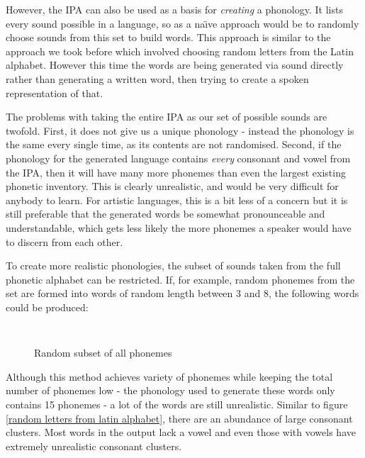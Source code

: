 \documentclass{report}
\begin{document}
	However, the IPA can also be used as a basis for \textit{creating} a phonology. It lists every sound possible in a language, so as a na\"{\i}ve approach would be to randomly choose sounds from this set to build words. This approach is similar to the approach we took before which involved choosing random letters from the Latin alphabet. However this time the words are being generated via sound directly rather than generating a written word, then trying to create a spoken representation of that.
	
	The problems with taking the entire IPA as our set of possible sounds are twofold. First, it does not give us a unique phonology - instead the phonology is the same every single time, as its contents are not randomised. Second, if the phonology for the generated language contains \textit{every} consonant and vowel from the IPA, then it will have many more phonemes than even the largest existing phonetic inventory. This is clearly unrealistic, and would be very difficult for anybody to learn. For artistic languages, this is a bit less of a concern but it is still preferable that the generated words be somewhat pronounceable and understandable, which gets less likely the more phonemes a speaker would have to discern from each other.
	
	To create more realistic phonologies, the subset of sounds taken from the full phonetic alphabet can be restricted. If, for example, random phonemes from the set are formed into words of random length between 3 and 8, the following words could be produced:
	
	\begin{figure}[h]
	\caption{Random subset of all phonemes}
	\label{random subset of all phonemes}	
	\begin{tcolorbox}

		\texttt{
		}
	\end{tcolorbox}
\end{figure}

	Although this method achieves variety of phonemes while keeping the total number of phonemes low - the phonology used to generate these words only contains 15 phonemes - a lot of the words are still unrealistic. Similar to figure \ref{random letters from latin alphabet}, there are an abundance of large consonant clusters. Most words in the output lack a vowel and even those with vowels have extremely unrealistic consonant clusters.
	
\end{document}
